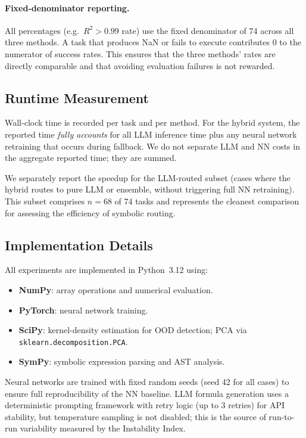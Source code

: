 \documentclass[twoside,11pt]{article}
\newcommand{\Rsq}{R^{2}}
\begin{document}
\paragraph{Fixed-denominator reporting.}
All percentages (e.g.\ $\Rsq > 0.99$ rate) use the fixed denominator of 74 across
all three methods.  A task that produces NaN or fails to execute contributes 0 to
the numerator of success rates.  This ensures that the three methods' rates are
directly comparable and that avoiding evaluation failures is not rewarded.

\subsection{Runtime Measurement}\label{subsec:runtime-measurement}
\label{sec:timing_setup}

Wall-clock time is recorded per task and per method.  For the hybrid system,
the reported time \emph{fully accounts} for all LLM inference time plus any
neural network retraining that occurs during fallback.  We do not separate
LLM and NN costs in the aggregate reported time; they are summed.

We separately report the speedup for the LLM-routed subset (cases where the
hybrid routes to pure LLM or ensemble, without triggering full NN retraining).
This subset comprises $n=68$ of 74 tasks and represents the cleanest comparison
for assessing the efficiency of symbolic routing.

\subsection{Implementation Details}\label{subsec:implementation-details}
\label{sec:setup_impl}

All experiments are implemented in Python~3.12 using:
\begin{itemize}
  \item \textbf{NumPy}: array operations and numerical evaluation.
  \item \textbf{PyTorch}: neural network training.
  \item \textbf{SciPy}: kernel-density estimation for OOD detection; PCA via
    \texttt{sklearn.decomposition.PCA}.
  \item \textbf{SymPy}: symbolic expression parsing and AST analysis.
\end{itemize}

Neural networks are trained with fixed random seeds (seed 42 for all cases) to
ensure full reproducibility of the NN baseline.  LLM formula generation uses a
deterministic prompting framework with retry logic (up to 3 retries) for API
stability, but temperature sampling is not disabled; this is the source of
run-to-run variability measured by the Instability Index.
\end{document}
